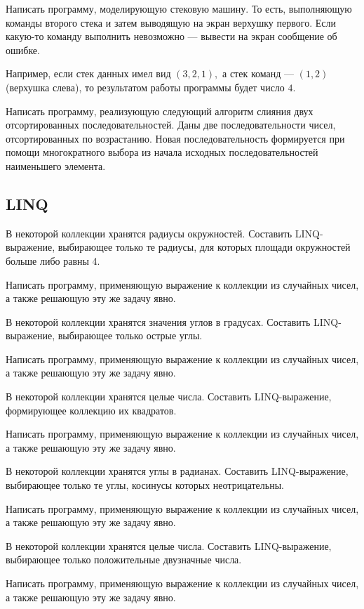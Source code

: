 Написать программу, моделирующую стековую машину. То есть, выполняющую команды второго стека и затем выводящую
на экран верхушку первого. Если какую-то команду выполнить невозможно
— вывести на экран сообщение об ошибке.

Например, если стек данных имел вид $(3, 2, 1),$ а стек команд —
$(1, 2)$ (верхушка слева), то результатом работы программы будет число
$4$.

\task Написать программу, реализующую следующий алгоритм слияния двух
отсортированных последовательностей. Даны две последовательности
чисел, отсортированных по возрастанию. Новая последовательность
формируется при помощи многократного выбора из начала исходных
последовательностей наименьшего элемента.


\subsection{LINQ}

\task В некоторой коллекции хранятся радиусы окружностей. Составить
LINQ-выражение, выбирающее только те радиусы, для которых площади
окружностей больше либо равны 4.

Написать программу, применяющую выражение к коллекции из случайных
чисел, а также решающую эту же задачу явно.

\task В некоторой коллекции хранятся значения углов в
градусах. Составить LINQ-выражение, выбирающее только острые углы.

Написать программу, применяющую выражение к коллекции из случайных
чисел, а также решающую эту же задачу явно.

\task В некоторой коллекции хранятся целые числа. Составить
LINQ-выражение, формирующее коллекцию их квадратов.

Написать программу, применяющую выражение к коллекции из случайных
чисел, а также решающую эту же задачу явно.

\task В некоторой коллекции хранятся углы в радианах. Составить
LINQ-выражение, выбирающее только те углы, косинусы которых
неотрицательны.

Написать программу, применяющую выражение к коллекции из случайных
чисел, а также решающую эту же задачу явно.

\task В некоторой коллекции хранятся целые числа. Составить
LINQ-выражение, выбирающее только положительные двузначные числа.

Написать программу, применяющую выражение к коллекции из случайных
чисел, а также решающую эту же задачу явно.

